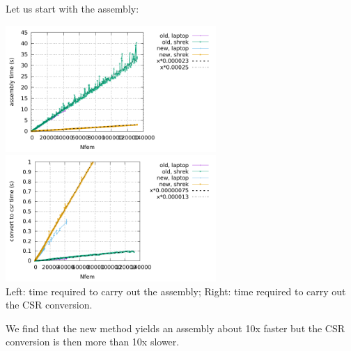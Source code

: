 Let us start with the assembly:
\begin{center}
\includegraphics[width=8cm]{python_codes/fieldstone_176/results/assembly.pdf}
\includegraphics[width=8cm]{python_codes/fieldstone_176/results/convert2csr.pdf}\\
{\captionfont Left: time required to carry out the assembly; Right: time
required to carry out the CSR conversion.}
\end{center}
We find that the new method yields an assembly about 10x faster 
but the CSR conversion is then more than 10x slower. 


